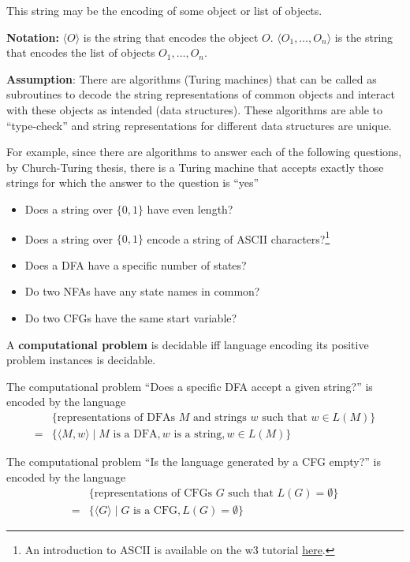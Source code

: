 \documentclass[12pt, oneside]{article}
\begin{document}
This string may be the encoding of some object or  list of  objects.  

{\bf Notation:} $\langle O \rangle$ is the string that encodes the object $O$.
$\langle O_1, \ldots, O_n \rangle$ is the string that encodes the list of objects $O_1, \ldots, O_n$.

{\bf Assumption}: There are algorithms (Turing  machines) that can be called as subroutines
to decode the string representations of common objects and  interact with these objects as intended
(data structures). These algorithms are able to ``type-check'' and string representations for different
data structures are unique.
  
\newpage
For example, since there are algorithms to answer each of the following questions,
by Church-Turing thesis, there is a Turing machine that accepts exactly those strings for which the 
answer to the question is ``yes''
\begin{itemize}
    \item Does a string over $\{0,1\}$ have even length?

    \item Does a string over $\{0,1\}$ encode a string of ASCII characters?\footnote{An introduction to ASCII 
    is available on the w3 tutorial \href{https://www.w3schools.com/charsets/ref_html_ascii.asp}{here}.}

    \item Does a DFA have a specific number of states?

    \item Do two NFAs have any state names in common?

    \item Do two CFGs have the same start variable?

  \end{itemize}



A {\bf computational problem} is decidable iff language encoding its positive problem instances
is decidable.

The computational problem ``Does a specific DFA accept a given string?'' is encoded by the language
\begin{align*}
  &\{ \textrm{representations of DFAs $M$ and strings $w$ such that $w \in L(M)$}\}  \\
  =& \{ \langle M, w \rangle \mid M \textrm{ is a DFA}, w \textrm{ is a string}, w \in L(M) \}
\end{align*}

The computational problem ``Is the language generated by a CFG empty?'' is encoded by the language
\begin{align*}
  &\{ \textrm{representations of CFGs $G$  such that $L(G) = \emptyset$}\}  \\
  =& \{ \langle G \rangle \mid G \textrm{ is a CFG},  L(G) = \emptyset \}
\end{align*}
\end{document}
